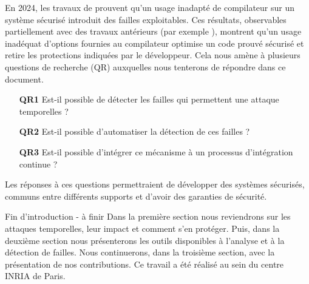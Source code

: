 En 2024, les travaux de \citeauthor{schneider2024breakingbadcompilersbreak} \cite{schneider2024breakingbadcompilersbreak} prouvent qu'un usage inadapté de compilateur sur un système sécurisé introduit des failles exploitables. Ces résultats, observables partiellement avec des travaux antérieurs (par exemple \cite{binsecRel2019}), montrent qu'un usage inadéquat d'options fournies au compilateur optimise un code prouvé sécurisé et retire les protections indiquées par le développeur. Cela nous amène à plusieurs questions de recherche (QR) auxquelles nous tenterons de répondre dans ce document.
\begin{enumerate}
    \item[\textbf{QR1}] Est-il possible de détecter les failles qui permettent une attaque temporelles ?
    \item[\textbf{QR2}] Est-il possible d'automatiser la détection de ces failles ?
    \item[\textbf{QR3}] Est-il possible d'intégrer ce mécanisme à un processus d'intégration continue ?
\end{enumerate}

Les réponses à ces questions permettraient de développer des systèmes sécurisés, communs entre différents supports et d'avoir des garanties de sécurité.

\begin{Acorriger}{Fin d'introduction - à finir}
    Dans la première section nous reviendrons sur les attaques temporelles, leur impact et comment s'en protéger. Puis, dans la deuxième section nous présenterons les outils disponibles à l'analyse et à la détection de failles. Nous continuerons, dans la troisième section, avec la présentation de nos contributions.\medbreak
    Ce travail a été réalisé au sein du centre INRIA de Paris.
\end{Acorriger}
